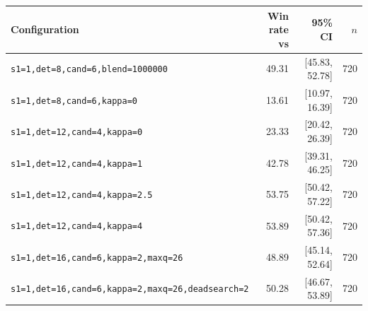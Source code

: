 \begin{tabular}{lrrr}
\toprule
Configuration & Win rate vs \vfive{} & 95\% CI & $n$ \\
\midrule
\texttt{s1=1,det=8,cand=6,blend=1000000} & 49.31 & [45.83, 52.78] & 720 \\
\texttt{s1=1,det=8,cand=6,kappa=0} & 13.61 & [10.97, 16.39] & 720 \\
\texttt{s1=1,det=12,cand=4,kappa=0} & 23.33 & [20.42, 26.39] & 720 \\
\texttt{s1=1,det=12,cand=4,kappa=1} & 42.78 & [39.31, 46.25] & 720 \\
\texttt{s1=1,det=12,cand=4,kappa=2.5} & 53.75 & [50.42, 57.22] & 720 \\
\texttt{s1=1,det=12,cand=4,kappa=4} & 53.89 & [50.42, 57.36] & 720 \\
\texttt{s1=1,det=16,cand=6,kappa=2,maxq=26} & 48.89 & [45.14, 52.64] & 720 \\
\texttt{s1=1,det=16,cand=6,kappa=2,maxq=26,deadsearch=2} & 50.28 & [46.67, 53.89] & 720 \\
\bottomrule
\end{tabular}
